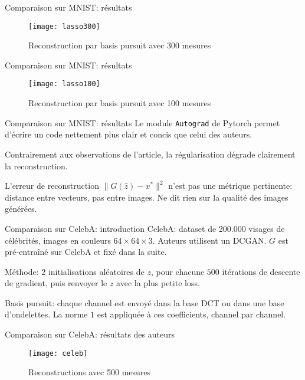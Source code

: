 \documentclass{beamer}
\begin{document}
\begin{frame}{Comparaison sur MNIST: résultats}
\begin{figure}
\texttt{[image: lasso300]}
\caption{Reconstruction par basis pursuit avec 300 mesures} 
\end{figure}
\end{frame}

\begin{frame}{Comparaison sur MNIST: résultats}
\begin{figure}
\texttt{[image: lasso100]}
\caption{Reconstruction par basis pursuit avec 100 mesures} 
\end{figure}
\end{frame}

\begin{frame}{Comparaison sur MNIST: résultats}
Le module \texttt{Autograd} de Pytorch permet d'écrire un code nettement plus clair et concis que celui des auteurs.
\vspace{2em}

Contrairement aux observations de l'article, la régularisation dégrade clairement la reconstruction.

\vspace{2em}
L'erreur de reconstruction $\|G(\hat z) - x^*\|^2$ n'est pas une métrique pertinente: distance entre vecteurs, pas entre images. Ne dit rien sur la qualité des images générées.
\end{frame}


\begin{frame}{Comparaison sur CelebA: introduction}
CelebA: dataset de 200.000 visages de célébrités, images en couleurs $64\times 64\times 3$. Auteurs utilisent un DCGAN.\newline
$G$ est pré-entraîné sur CelebA et fixé dans la suite.
\vspace{1em}

Méthode: $2$ initialisations aléatoires de $z$, pour chacune $500$ itérations de descente de gradient, puis renvoyer le $z$ avec la plus petite loss.
\vspace{1em}

Basis pursuit: chaque channel est envoyé dans la base DCT ou dans une base d'ondelettes. La norme $1$ est appliquée à ces coefficients, channel par channel.
\end{frame}


\begin{frame}{Comparaison sur CelebA: résultats des auteurs}
\begin{figure}
\texttt{[image: celeb]}
\caption{Reconstructions avec 500 mesures} 
\end{figure}
\end{frame}
\end{document}
